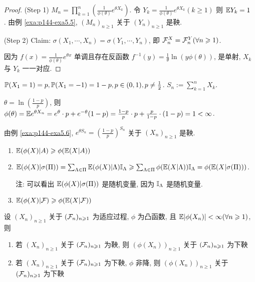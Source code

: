 \begin{proof}
    (Step 1) $M_n=\prod_{k=1}^n (\frac{1}{\phi(\theta)}e^{\theta X_k})$. 令 $Y_k=\frac{1}{\phi(\theta)}e^{\theta X_k}(k\geq 1)$ 则 $\mathbb E Y_k=1$. 由例 \ref{exa:p144-exa5.5}, $(M_n)_{n\geq 1}$ 关于 $(Y_n)_{n\geq 1}$ 是鞅.

    (Step 2) Claim: $\sigma(X_1,\cdots,X_n)=\sigma(Y_1,\cdots,Y_n)$, 即 $\mathcal{F}_n^X=\mathcal{F}_n^Y(\forall n\geqslant 1)$.
    
    因为 $f(x)=\frac{1}{\phi(\theta)}e^{\theta x}$ 单调且存在反函数 $f^{-1}(y)=\frac{1}{\theta}\ln(y\phi(\theta))$, 是单射, $X_k$ 与 $Y_k$ 一一对应. 
\end{proof}

\begin{example}[赌徒破产]\label{exa:p145-exa5.3}
    $\mathbb{P}(X_1=1)=p, \mathbb{P}(X_1=-1)=1-p,p\in (0,1),p\neq \frac{1}{2}$. $S_n:=\sum_{k=1}^n X_k$.
\end{example}

$\theta=\ln(\frac{1-p}{p})$, 则 $\phi(\theta)=\mathbb E e^{\theta X_n}=e^{\theta}\cdot p+e^{-\theta}(1-p)=\frac{1-p}{p}\cdot p+\frac{p}{1-p}\cdot (1-p)=1<\infty$. 

由例 \ref{exa:p144-exa5.6}, $e^{\theta S_n}=(\frac{1-p}{p})^{S_n}$ 关于 $(X_n)_{n\geq 1}$ 是鞅.

\begin{lemma}[Jensen不等式]
    \begin{enumerate}
        \item $\mathbb E (\phi(X)|A)\geqslant \phi(\mathbb E(X|A))$
        \item $\mathbb E(\phi(X)|\sigma(\Pi))=\sum_{\Lambda\in \Pi}\mathbb E(\phi(X)|\Lambda)\mathbb I_{\Lambda}\geqslant \sum_{\Lambda\in \Pi} \phi(\mathbb E(X|\Lambda))\mathbb I_{\Lambda}=\phi(\mathbb E(X|\sigma(\Pi)))$.
        
        注: 可以看出 $\mathbb E(\phi(X)|\sigma(\Pi))$ 是随机变量, 因为 $\mathbb I_{\Lambda}$ 是随机变量.
        \item $\mathbb E(\phi(X)|\mathcal{F})\geqslant \phi(\mathbb E(X|\mathcal{F}))$
    \end{enumerate}
\end{lemma}

\begin{property}
设 $(X_n)_{n\geq 1}$ 关于 $(\mathcal{F}_n)_{n\geqslant 1}$ 为适应过程, $\phi$ 为凸函数, 且 $\mathbb E |\phi(X_n)|<\infty (\forall n\geqslant 1)$, 则
\begin{enumerate}
    \item 若 $(X_n)_{n\geq 1}$ 关于 $(\mathcal{F}_n)_{n\geqslant 1}$ 为鞅, 则 $(\phi(X_n))_{n\geq 1}$ 关于 $(\mathcal{F}_n)_{n\geqslant 1}$ 为下鞅
    \item 若 $(X_n)_{n\geq 1}$ 关于 $(\mathcal{F}_n)_{n\geqslant 1}$ 为下鞅, $\phi$ 非降, 则 $(\phi(X_n))_{n\geq 1}$ 关于 $(\mathcal{F}_n)_{n\geqslant 1}$ 为下鞅
\end{enumerate}
\end{property}

